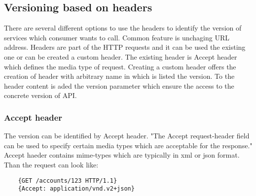 



\subsection{Versioning based on headers}

There are several different options to use the headers to identify the version of services which consumer wants to call. Common feature is unchaging URL address. Headers are part of the HTTP requests and it can be used the existing one or can be created a custom header. The existing header is Accept header which defines the media type of request. Creating a custom header offers the creation of header with arbitrary name in which is listed the version. To the header content is aded the version parameter which ensure the access to the concrete version of API.

\subsubsection{Accept header}
The version can be identified by Accept header. "The Accept request-header field can be used to specify certain media types which are acceptable for the response." \cite{website:w3} Accept haeder contains \gls{mime-types} which are typically in \gls{xml} or \gls{json} format. Than the request can look like:

\begin{lstlisting}
    {GET /accounts/123 HTTP/1.1}
    {Accept: application/vnd.v2+json}
\end{lstlisting}

